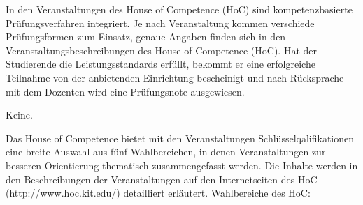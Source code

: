 \begin{course}

\setdoclanguagegerman
{}


\courseterm{}
\courseinstructionlanguage{}

\coursehead


\label{cour_14497.dp_997}


\begin{styleenv}
\begin{assessment}
In den Veranstaltungen des House of Competence (HoC) sind kompetenzbasierte Prüfungsverfahren integriert. Je nach Veranstaltung kommen verschiede Prüfungsformen zum Einsatz, genaue Angaben finden sich in den Veranstaltungsbeschreibungen des House of Competence (HoC). Hat der Studierende die Leistungsstandards erfüllt, bekommt er eine erfolgreiche Teilnahme von der anbietenden Einrichtung bescheinigt und nach Rücksprache mit dem Dozenten wird eine Prüfungsnote ausgewiesen.


\end{assessment}

\begin{conditions}Keine.\end{conditions}


\end{styleenv}

\begin{learningoutcomes}

\end{learningoutcomes}

\begin{content}
Das House of Competence bietet mit den Veranstaltungen Schlüsselqalifikationen eine breite Auswahl aus fünf Wahlbereichen, in denen Veranstaltungen zur besseren Orientierung thematisch zusammengefasst werden. Die Inhalte werden in den Beschreibungen der Veranstaltungen auf den Internetseiten des HoC (http://www.hoc.kit.edu/) detailliert erläutert.\newline
\newline
Wahlbereiche des HoC:


\end{content}
\end{course}
